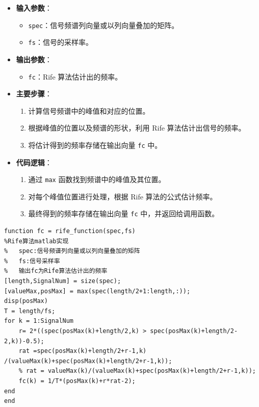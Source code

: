 \documentclass[a4paper,12pt]{article}
\begin{document}
\begin{itemize}
    \item \textbf{输入参数}：
    \begin{itemize}
        \item \texttt{spec}：信号频谱列向量或以列向量叠加的矩阵。
        \item \texttt{fs}：信号的采样率。
    \end{itemize}
    
    \item \textbf{输出参数}：
    \begin{itemize}
        \item \texttt{fc}：Rife 算法估计出的频率。
    \end{itemize}
    
    \item \textbf{主要步骤}：
    \begin{enumerate}
        \item 计算信号频谱中的峰值和对应的位置。
        \item 根据峰值的位置以及频谱的形状，利用 Rife 算法估计出信号的频率。
        \item 将估计得到的频率存储在输出向量 \texttt{fc} 中。
    \end{enumerate}
    
    \item \textbf{代码逻辑}：
    \begin{enumerate}
        \item 通过 \texttt{max} 函数找到频谱中的峰值及其位置。
        \item 对每个峰值位置进行处理，根据 Rife 算法的公式估计频率。
        \item 最终得到的频率存储在输出向量 \texttt{fc} 中，并返回给调用函数。
    \end{enumerate}
\end{itemize}

\begin{lstlisting}
function fc = rife_function(spec,fs)
%Rife算法matlab实现
%   spec:信号频谱列向量或以列向量叠加的矩阵
%   fs:信号采样率
%   输出fc为Rife算法估计出的频率
[length,SignalNum] = size(spec);
[valueMax,posMax] = max(spec(length/2+1:length,:));
disp(posMax)
T = length/fs;
for k = 1:SignalNum
    r= 2*((spec(posMax(k)+length/2,k) > spec(posMax(k)+length/2-2,k))-0.5);
    rat =spec(posMax(k)+length/2+r-1,k) /(valueMax(k)+spec(posMax(k)+length/2+r-1,k));
    % rat = valueMax(k)/(valueMax(k)+spec(posMax(k)+length/2+r-1,k));
    fc(k) = 1/T*(posMax(k)+r*rat-2);
end
end

\end{lstlisting}
\end{document}
